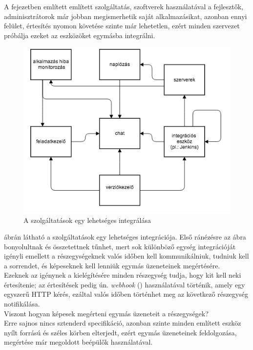 A fejezetben említett említett szolgáltatás, szoftverek használatával a fejlesztők, adminisztrátorok már jobban megismerhetik saját alkalmazásikat, azonban ennyi felület, értesítés nyomon követése szinte már lehetetlen, ezért minden szervezet próbálja ezeket az eszközöket egymásba integrálni.
\begin{figure}[ht]
	\centering
		\includegraphics[scale=1.0]{assets/integrated_services.png}%
		\caption[DUMMY]%
		{A szolgáltatások egy lehetséges integrálása}%
		\label{fig:integrated-services}
\end{figure}
 ábrán látható a szolgáltatások egy lehetséges integrációja. Első ránézésre az ábra bonyolultnak és összetettnek tűnhet, mert sok különböző egység integrációját igényli emellett a részegységeknek valós időben kell kommunikálniuk, tudniuk kell a sorrendet, és képeseknek kell lenniük egymás üzeneteinek megértésére.\\
Ezeknek az igénynek a kielégítésére minden részegység tudja, hogy kit kell neki értesítenie; az értesítések pedig ún. \emph{webhook} (\cite{web_hook}) használatával történik, amely egy egyszerű HTTP kérés, ezáltal valós időben történhet meg az következő részegység notifikálása.\\
Viszont hogyan képesek megérteni egymás üzeneteit a részegységek?\\
Erre sajnos nincs sztenderd specifikáció, azonban szinte minden említett eszköz nyílt forrású és széles körben elterjedt, ezért egymás üzeneteinek feldolgozása, megértése már megoldott beépülők használatával.\\

